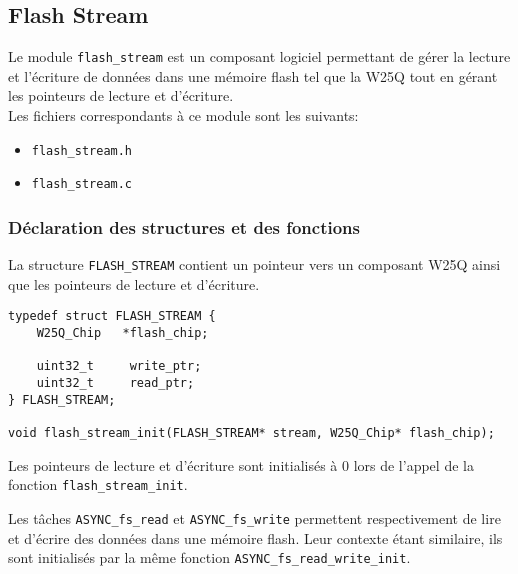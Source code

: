 \subsection{Flash Stream}
\label{subsec:flash_stream}

Le module \texttt{flash\_stream} est un composant logiciel permettant de gérer la
lecture et l'écriture de données dans une mémoire flash tel que la W25Q tout en
gérant les pointeurs de lecture et d'écriture.\\

Les fichiers correspondants à ce module sont les suivants:
\begin{itemize}
    \item \texttt{flash\_stream.h}
    \item \texttt{flash\_stream.c}
\end{itemize}

\subsubsection{Déclaration des structures et des fonctions}


La structure \texttt{FLASH\_STREAM} contient un pointeur vers un composant W25Q
ainsi que les pointeurs de lecture et d'écriture.\\

\begin{lstlisting}[style=prog, frame=shadowbox, label={lst:fs_struct},
    emph={[1]flash_stream_init}, emphstyle={[1]\color{C}},
    emph={[2]FLASH_STREAM, W25Q_Chip}, emphstyle={[2]\color{E}}]
typedef struct FLASH_STREAM {
    W25Q_Chip   *flash_chip;

    uint32_t     write_ptr;
    uint32_t     read_ptr;
} FLASH_STREAM;

void flash_stream_init(FLASH_STREAM* stream, W25Q_Chip* flash_chip);
\end{lstlisting}

Les pointeurs de lecture et d'écriture sont initialisés à 0 lors de l'appel de la
fonction \texttt{flash\_stream\_init}.


Les tâches \texttt{ASYNC\_fs\_read} et \texttt{ASYNC\_fs\_write} permettent
respectivement de lire et d'écrire des données dans une mémoire flash. Leur
contexte étant similaire, ils sont initialisés par la même fonction
\texttt{ASYNC\_fs\_read\_write\_init}.\\

